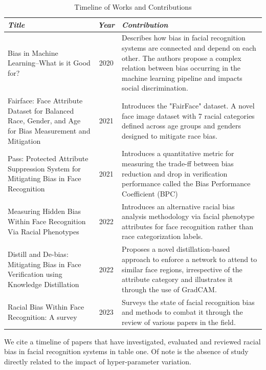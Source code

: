 \documentclass[conference]{IEEEtran}
\begin{document}
\begin{table}[H]
\caption{Timeline of Works and Contributions}
\centering
\begin{tabular}{|p{7cm}|c|p{9cm}|}
\hline
\textbf{\textit{Title}} & \textbf{\textit{Year}} & \textbf{\textit{Contribution}} \\
\hline
Bias in Machine Learning--What is it Good for? \cite{hellstrom2020bias} & 2020 & Describes how bias in facial recognition systems are connected and depend on each other. The authors propose a complex relation between bias occurring in the machine learning pipeline and impacts social discrimination. \\
\hline
Fairface: Face Attribute Dataset for Balanced Race, Gender, and Age for Bias Measurement and Mitigation 
\cite{karkkainen2021fairface} & 2021 & Introduces the "FairFace" dataset. A novel face image dataset with 7 racial categories defined across age groups and genders designed to mitigate race bias. \\
\hline
Pass: Protected Attribute Suppression System for Mitigating Bias in Face Recognition\cite{dhar2021pass} & 2021 & Introduces a quantitative metric for measuring the trade-ff between bias reduction and drop in verification performance called the Bias Performance Coefficient (BPC) \\
\hline
Measuring Hidden Bias Within Face Recognition Via Racial Phenotypes \cite{yucer2022measuring} & 2022 & Introduces an alternative racial bias analysis methodology via facial phenotype attributes for face recognition rather than race categorization labels.  \\
\hline
Distill and De-bias: Mitigating Bias in Face Verification using Knowledge Distillation\cite{dhar2022distill} & 2022 & Proposes a novel distillation-based approach to enforce a network to attend to similar face regions, irrespective of the attribute category and illustrates it through the use of GradCAM. \\
\hline
Racial Bias Within Face Recognition: A survey \cite{yucer2023racial} & 2023 & Surveys the state of facial recognition bias and methods to combat it through the review of various papers in the field. \\
\hline
\end{tabular}
\label{tab1}
\end{table}

We cite a timeline of papers that have investigated, evaluated and reviewed racial bias in facial recognition systems in table one. Of note is the absence of study directly related to the impact of hyper-parameter variation.
\end{document}
